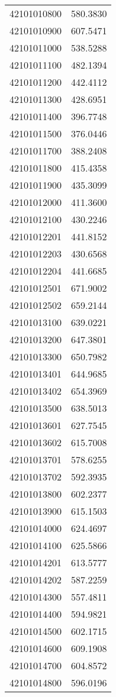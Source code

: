\begin{longtable}[t]{lr}
42101010800 & 580.3830\\
42101010900 & 607.5471\\
42101011000 & 538.5288\\
42101011100 & 482.1394\\
42101011200 & 442.4112\\
42101011300 & 428.6951\\
42101011400 & 396.7748\\
42101011500 & 376.0446\\
42101011700 & 388.2408\\
42101011800 & 415.4358\\
42101011900 & 435.3099\\
42101012000 & 411.3600\\
42101012100 & 430.2246\\
42101012201 & 441.8152\\
42101012203 & 430.6568\\
42101012204 & 441.6685\\
42101012501 & 671.9002\\
42101012502 & 659.2144\\
42101013100 & 639.0221\\
42101013200 & 647.3801\\
42101013300 & 650.7982\\
42101013401 & 644.9685\\
42101013402 & 654.3969\\
42101013500 & 638.5013\\
42101013601 & 627.7545\\
42101013602 & 615.7008\\
42101013701 & 578.6255\\
42101013702 & 592.3935\\
42101013800 & 602.2377\\
42101013900 & 615.1503\\
42101014000 & 624.4697\\
42101014100 & 625.5866\\
42101014201 & 613.5777\\
42101014202 & 587.2259\\
42101014300 & 557.4811\\
42101014400 & 594.9821\\
42101014500 & 602.1715\\
42101014600 & 609.1908\\
42101014700 & 604.8572\\
42101014800 & 596.0196\\

\end{longtable}
